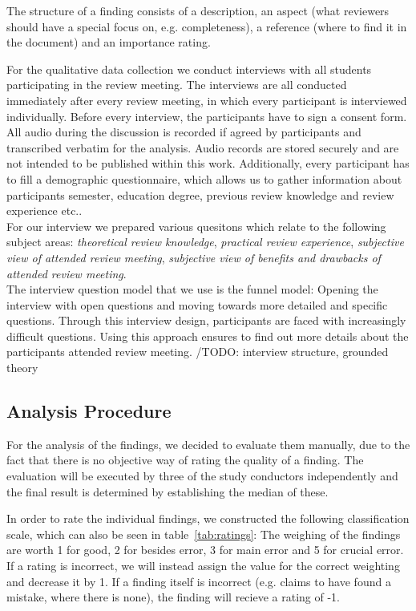 The structure of a finding consists of a description, an aspect (what reviewers should have a special focus on, e.g. completeness), a reference (where to find it in the document) and an importance rating.

For the qualitative data collection we conduct interviews with all students participating in the review meeting. The interviews are all conducted immediately after every review meeting, in which every participant is interviewed individually.  Before every interview, the participants have to sign a consent form. All audio during the discussion is recorded if agreed by participants and transcribed verbatim for the analysis. Audio records are stored securely and are not intended to be published within this work. Additionally, every participant has to fill a demographic questionnaire, which allows us to gather information about participants semester, education degree, previous review knowledge and review experience etc.. \\
For our interview we prepared various quesitons which relate to the following subject areas: \textit{theoretical review knowledge}, \textit{practical review experience}, \textit{subjective view of attended review meeting}, \textit{subjective view of benefits and drawbacks of attended review meeting}.\\
The interview question model that we use is the funnel model: Opening the interview with open questions and moving towards more detailed and specific questions. Through this interview design, participants are faced with increasingly difficult questions.  Using this approach ensures to find out more details about the participants attended review meeting. /TODO: interview structure, grounded theory

\subsection{Analysis Procedure}

For the analysis of the findings, we decided to evaluate them manually, due to the fact that there is no objective way of rating the quality of a finding. The evaluation will be executed by three of the study conductors independently and the final result is determined by establishing the median of these.

In order to rate the individual findings, we constructed the following classification scale, which can also be seen in table~\ref{tab:ratings}:
The weighing of the findings are worth 1 for good, 2 for besides error, 3 for main error and 5 for crucial error. If a rating is incorrect, we will instead assign the value for the correct weighting and decrease it by 1.
If a finding itself is incorrect (e.g. claims to have found a mistake, where there is none), the finding will recieve a rating of -1.

